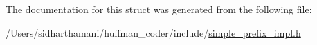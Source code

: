 The documentation for this struct was generated from the following file\-:\begin{DoxyCompactItemize}
\item 
/\-Users/sidharthamani/huffman\-\_\-coder/include/\hyperlink{simple__prefix__impl_8h}{simple\-\_\-prefix\-\_\-impl.\-h}\end{DoxyCompactItemize}
